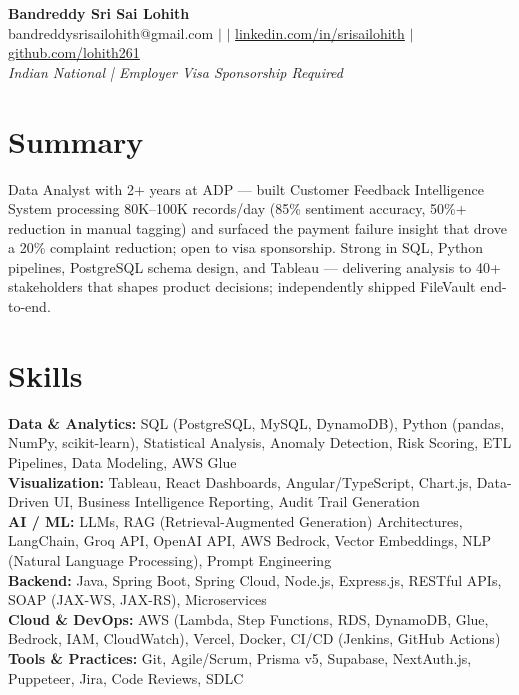 \documentclass[10pt,letterpaper]{article}
\newcommand{\skillrow}[2]{\textbf{#1:} #2 \\[1pt]}
\begin{document}
\begin{center}
  {\Huge\bfseries Bandreddy Sri Sai Lohith}\\[3pt]
  \small bandreddysrisailohith@gmail.com $\vert$ $\vert$\; \href{https://linkedin.com/in/srisailohith}{linkedin.com/in/srisailohith} $\vert$\; \href{https://github.com/lohith261}{github.com/lohith261} \\[2pt]
  \small\textit{Indian National | Employer Visa Sponsorship Required}
\end{center}

\section{Summary}

Data Analyst with 2+ years at ADP --- built Customer Feedback Intelligence System processing 80K--100K records/day (85\% sentiment accuracy, 50\%+ reduction in manual tagging) and surfaced the payment failure insight that drove a 20\% complaint reduction; open to visa sponsorship.
      Strong in SQL, Python pipelines, PostgreSQL schema design, and Tableau --- delivering analysis to 40+ stakeholders that shapes product decisions; independently shipped FileVault end-to-end.

\section{Skills}

\skillrow{Data \& Analytics}{SQL (PostgreSQL, MySQL, DynamoDB), Python (pandas, NumPy, scikit-learn), Statistical Analysis, Anomaly Detection, Risk Scoring, ETL Pipelines, Data Modeling, AWS Glue}
\skillrow{Visualization}{Tableau, React Dashboards, Angular/TypeScript, Chart.js, Data-Driven UI, Business Intelligence Reporting, Audit Trail Generation}
\skillrow{AI / ML}{LLMs, RAG (Retrieval-Augmented Generation) Architectures, LangChain, Groq API, OpenAI API, AWS Bedrock, Vector Embeddings, NLP (Natural Language Processing), Prompt Engineering}
\skillrow{Backend}{Java, Spring Boot, Spring Cloud, Node.js, Express.js, RESTful APIs, SOAP (JAX-WS, JAX-RS), Microservices}
\skillrow{Cloud \& DevOps}{AWS (Lambda, Step Functions, RDS, DynamoDB, Glue, Bedrock, IAM, CloudWatch), Vercel, Docker, CI/CD (Jenkins, GitHub Actions)}
\skillrow{Tools \& Practices}{Git, Agile/Scrum, Prisma v5, Supabase, NextAuth.js, Puppeteer, Jira, Code Reviews, SDLC}
\end{document}
